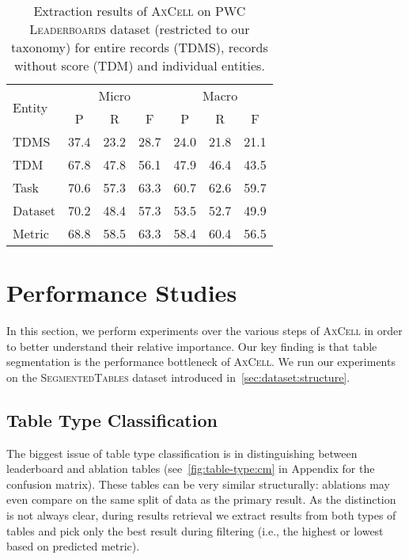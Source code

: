 \documentclass[11pt,a4paper]{article}
\newcommand{\model}{\textsc{AxCell}}
\newcommand{\leaderboards}{\textsc{PWC Leaderboards}}
\newcommand{\finegrained}{\textsc{SegmentedTables}}
\begin{document}
\begin{table}[t]
    \small
    \centering
    \setlength{\tabcolsep}{4pt}
    \caption{Extraction results of \model{} on  \leaderboards{} dataset (restricted to our taxonomy) for entire records (TDMS), records without score (TDM) and individual entities.}
    \label{tab:results:end-to-end:pwc-leaderboards}
    \begin{tabular}{lcccccc}
     \toprule
  \multirow{2}{*}{Entity} & \multicolumn{3}{c}{Micro} & \multicolumn{3}{c}{Macro}\\
  \cmidrule(lr){2-4}\cmidrule(lr){5-7}
   & P & R & F & P & R & F\\\midrule
TDMS     & 37.4 & 23.2 & 28.7 & 24.0 & 21.8 & 21.1\\\midrule
TDM      & 67.8 & 47.8 & 56.1 & 47.9 & 46.4 & 43.5\\
Task     & 70.6 & 57.3 & 63.3 & 60.7 & 62.6 & 59.7\\
Dataset  & 70.2 & 48.4 & 57.3 & 53.5 & 52.7 & 49.9\\
Metric   & 68.8 & 58.5 & 63.3 & 58.4 & 60.4 & 56.5\\
\bottomrule
    \end{tabular}
\end{table}
 \section{Performance Studies}
\label{sec:ablation}

In this section, we perform experiments over the various steps of \model{} in order to better understand their relative importance. Our key finding is that table segmentation is the performance bottleneck of \model{}. We run our experiments on the \finegrained{} dataset introduced in~\cref{sec:dataset:structure}.

\subsection{Table Type Classification}
\label{sec:ablation:table-type}

The biggest issue of table type classification is in distinguishing between leaderboard and ablation tables (see~\cref{fig:table-type:cm} in Appendix for the confusion matrix). These tables can be very similar structurally: ablations may even compare on the same split of data as the primary result. As the distinction is not always clear, during results retrieval we extract results from both types of tables and pick only the best result during filtering (i.e., the highest or lowest based on predicted metric).
\end{document}

